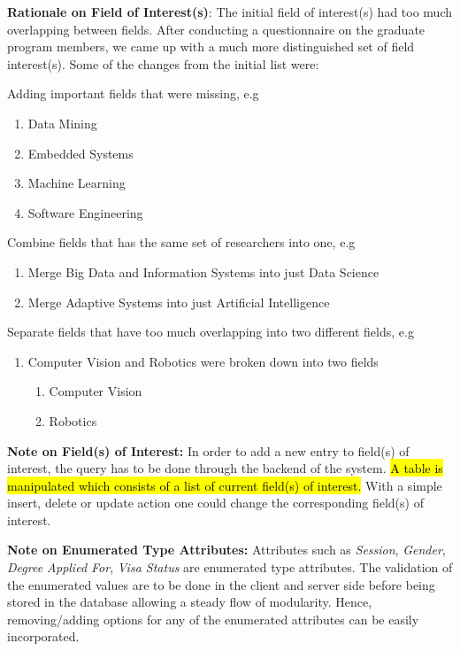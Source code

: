 \documentclass[fontsize=12pt,paper=letter,twoside]{scrartcl}
\begin{document}
\smallskip
\noindent \textbf{Rationale on Field of Interest(s)}: The initial field of interest(s) had too much overlapping between fields. After conducting a questionnaire on the graduate program members, we came up with a much more distinguished set of field interest(s). Some of the changes from the initial list were:
\begin{mylist}
\item Adding important fields that were missing, e.g
\begin{enumerate}
\item Data Mining
\item Embedded Systems
\item Machine Learning
\item Software Engineering
\end{enumerate}
\item Combine fields that has the same set of researchers into one, e.g
\begin{enumerate}
\item Merge Big Data and Information Systems into just Data Science
\item Merge Adaptive Systems into just Artificial Intelligence
\end{enumerate}
\item Separate fields that have too much overlapping into two different fields, e.g
\begin{enumerate}
\item Computer Vision and Robotics were broken down into two fields
\begin{enumerate}
\item Computer Vision
\item Robotics
\end{enumerate}
\end{enumerate}
\end{mylist}

\smallskip
\noindent \textbf{Note on Field(s) of Interest:} In order to add a new entry to field(s) of interest, the query has to be done through the backend of the system. \hl{A table is manipulated which consists of a list of current field(s) of interest.} With a simple insert, delete or update action one could change the corresponding field(s) of interest.

\smallskip
\noindent \textbf{Note on Enumerated Type Attributes:} Attributes such as \emph{Session}, \emph{Gender}, \emph{Degree Applied For}, \emph{Visa Status} are enumerated type attributes. The validation of the enumerated values are to be done in the client and server side before being stored in the database allowing a steady flow of modularity. Hence, removing/adding options for any of the enumerated attributes can be easily incorporated.
\end{document}
